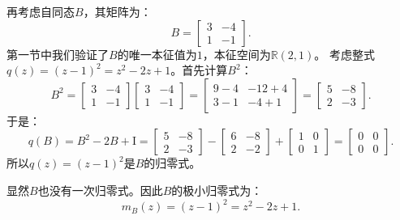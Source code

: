 \documentclass[12pt,UTF8]{ctexbook}
\begin{document}
再考虑自同态$B$，其矩阵为：
$$
B = \begin{bmatrix} 3 & -4 \\ 1 & -1 \end{bmatrix}.
$$
第一节中我们验证了$B$的唯一本征值为$1$，本征空间为$\mathbb{R}(2,1)$。
考虑整式$q(z) = (z-1)^2 = z^2 - 2z + 1$。首先计算$B^2$：
$$
B^2 = \begin{bmatrix} 3 & -4 \\ 1 & -1 \end{bmatrix}\begin{bmatrix} 3 & -4 \\ 1 & -1 \end{bmatrix} = \begin{bmatrix} 9-4 & -12+4 \\ 3-1 & -4+1 \end{bmatrix} = \begin{bmatrix} 5 & -8 \\ 2 & -3 \end{bmatrix}.
$$
于是：
$$
q(B) = B^2 - 2B + \mathrm{I} = \begin{bmatrix} 5 & -8 \\ 2 & -3 \end{bmatrix} - \begin{bmatrix} 6 & -8 \\ 2 & -2 \end{bmatrix} + \begin{bmatrix} 1 & 0 \\ 0 & 1 \end{bmatrix} = \begin{bmatrix} 0 & 0 \\ 0 & 0 \end{bmatrix}.
$$
所以$q(z) = (z-1)^2$是$B$的归零式。

显然$B$也没有一次归零式。因此$B$的极小归零式为：
$$
m_B(z) = (z-1)^2 = z^2 - 2z + 1.
$$
\end{document}
